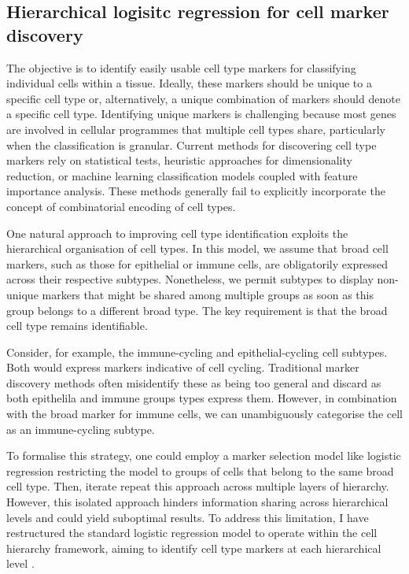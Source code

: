 \subsection{Hierarchical logisitc regression for cell marker discovery}
\label{sec:modalities-schierarchy}


The objective is to identify easily usable cell type markers for classifying individual cells within a tissue. Ideally, these markers should be unique to a specific cell type or, alternatively, a unique combination of markers should denote a specific cell type. Identifying unique markers is challenging because most genes are involved in cellular programmes that multiple cell types share, particularly when the classification is granular. Current methods for discovering cell type markers rely on statistical tests, heuristic approaches for dimensionality reduction, or machine learning classification models coupled with feature importance analysis. These methods generally fail to explicitly incorporate the concept of combinatorial encoding of cell types.

One natural approach to improving cell type identification exploits the hierarchical organisation of cell types. In this model, we assume that broad cell markers, such as those for epithelial or immune cells, are obligatorily expressed across their respective subtypes. Nonetheless, we permit subtypes to display non-unique markers that might be shared among multiple groups as soon as this group belongs to a different broad type. The key requirement is that the broad cell type remains identifiable.

Consider, for example, the immune-cycling and epithelial-cycling cell subtypes. Both would express markers indicative of cell cycling. Traditional marker discovery methods often misidentify these as being too general and discard as both epithelila and immune groups types express them. However, in combination with the broad marker for immune cells, we can unambiguously categorise the cell as an immune-cycling subtype.

To formalise this strategy, one could employ a marker selection model like logistic regression restricting the model to groups of cells that belong to the same broad cell type. Then, iterate repeat this approach across multiple layers of hierarchy. However, this isolated approach hinders information sharing across hierarchical levels and could yield suboptimal results. To address this limitation, I have restructured the standard logistic regression model to operate within the cell hierarchy framework, aiming to identify cell type markers at each hierarchical level .

